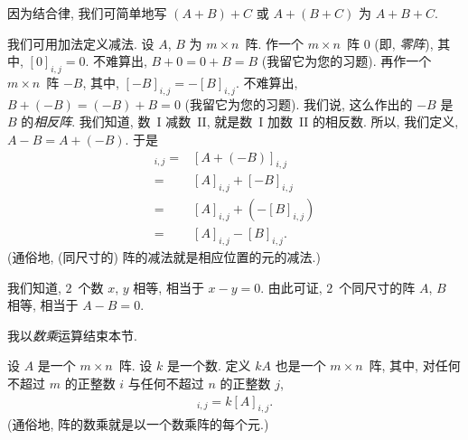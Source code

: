 \documentclass[../libro.tex]{subfiles}
\begin{document}
因为结合律, 我们可简单地写
\((A + B) + C\) 或 \(A + (B + C)\)
为 \(A + B + C\).

\vspace{2ex}

我们可用加法定义减法.
设 \(A\), \(B\) 为 \(m \times n\)~阵.
作一个 \(m \times n\)~阵 \(0\)
(即, \emph{零阵}),
其中, \([0]_{i,j} = 0\).
不难算出, \(B + 0 = 0 + B = B\)
(我留它为您的习题).
再作一个 \(m \times n\)~阵 \(-B\),
其中, \([-B]_{i,j} = -[B]_{i,j}\).
不难算出, \(B + (-B) = (-B) + B = 0\)
(我留它为您的习题).
我们说, 这么作出的 \(-B\) 是 \(B\) 的\emph{相反阵}.
我们知道, 数~I 减数~II, 就是数~I 加数~II 的相反数.
所以, 我们定义, \(A - B = A + (-B)\).
于是
\begin{align*}
    [A - B]_{i,j}
    = {} & [A + (-B)]_{i,j}         \\
    = {} & [A]_{i,j} + [-B]_{i,j}   \\
    = {} & [A]_{i,j} + (-[B]_{i,j}) \\
    = {} & [A]_{i,j} - [B]_{i,j}.
\end{align*}
(通俗地, (同尺寸的) 阵的减法就是相应位置的元的减法.)

我们知道, \(2\)~个数 \(x\), \(y\) 相等,
相当于 \(x - y = 0\).
由此可证,
\(2\)~个同尺寸的阵 \(A\), \(B\) 相等,
相当于 \(A - B = 0\).

\vspace{2ex}

我以\emph{数乘}运算结束本节.

\begin{definition}[阵的数乘]
    设 \(A\) 是一个 \(m \times n\)~阵.
    设 \(k\) 是一个数.
    定义 \(kA\) 也是一个 \(m \times n\)~阵,
    其中, 对任何不超过 \(m\) 的正整数 \(i\)
    与任何不超过 \(n\) 的正整数 \(j\),
    \begin{align*}
        [kA]_{i,j} = k[A]_{i,j}.
    \end{align*}
    (通俗地, 阵的数乘就是以一个数乘阵的每个元.)
\end{definition}
\end{document}
